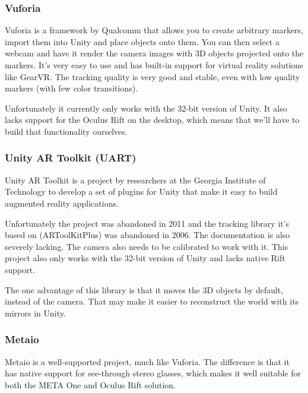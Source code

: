 			\subsubsection{Vuforia} \label{sssec:vuforia}
				Vuforia is a framework by Qualcomm that allows you to create
				arbitrary markers, import them into Unity and place objects onto
				them. You can then select a webcam and have it render the camera
				images with 3D objects projected onto the markers. It's very
				easy to use and has built-in support for virtual reality
				solutions like GearVR. The tracking quality is very good and
				stable, even with low quality markers (with few color transitions).

				Unfortunately it currently only works with the 32-bit version of
				Unity. It also lacks support for the Oculus Rift on the desktop,
				which means that we'll have to build that functionality ourselves.

			\subsubsection{Unity AR Toolkit (UART)} \label{sssec:uart}
				Unity AR Toolkit \cite{uart} is a project by researchers at the
				Georgia Institute of Technology to develop a set of plugins for
				Unity that make it easy to build augmented reality applications.

				Unfortunately the project was abandoned in 2011 and the tracking
				library it's based on (ARToolKitPlus) was abandoned in 2006. The
				documentation is also severely lacking. The camera also needs to
				be calibrated to work with it. This project also only works with
				the 32-bit version of Unity and lacks native Rift support.

				The one advantage of this library is that it moves the 3D
				objects by default, instead of the camera. That may make it
				easier to reconstruct the world with its mirrors in Unity.

			\subsubsection{Metaio} \label{sssec:metaio}
				Metaio is a well-supported project, much like Vuforia. The
				difference is that it has native support for see-through stereo
				glasses, which makes it well suitable for both the META One and
				Oculus Rift solution.

